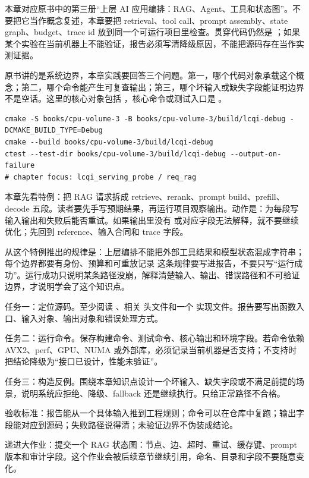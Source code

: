 
本章对应原书中的第三册“上层 AI 应用编排：RAG、Agent、工具和状态图”。不要把它当作概念复述，本章要把 retrieval、tool call、prompt assembly、state graph、budget、trace id 放到同一个可运行项目里检查。贯穿代码仍然是 ；如果某个实验在当前机器上不能验证，报告必须写清降级原因，不能把源码存在当作实测证据。


原书讲的是系统边界，本章实践要回答三个问题。第一，哪个代码对象承载这个概念；第二，哪个命令能产生可复查输出；第三，哪个坏输入或缺失字段能证明边界不是空话。这里的核心对象包括 ，核心命令或测试入口是 。

\begin{lstlisting}[numbers=none,caption={第 8 章实践：RAG、Agent 与状态图边界 的最小命令入口}]
cmake -S books/cpu-volume-3 -B books/cpu-volume-3/build/lcqi-debug -DCMAKE_BUILD_TYPE=Debug
cmake --build books/cpu-volume-3/build/lcqi-debug
ctest --test-dir books/cpu-volume-3/build/lcqi-debug --output-on-failure
# chapter focus: lcqi_serving_probe / req_rag
\end{lstlisting}


本章先看特例：把 RAG 请求拆成 retrieve、rerank、prompt build、prefill、decode 五段。读者要先手写预期结果，再运行项目观察输出。动作是：为每段写输入输出和失败后能否重试。如果输出里没有  或对应字段无法解释，就不要继续优化；先回到 reference、输入合同和 trace 字段。

从这个特例推出的规律是：上层编排不能把外部工具结果和模型状态混成字符串；每个边界都要有身份、预算和可重放记录 这条规律要写进报告，不要只写“运行成功”。运行成功只说明某条路径没崩，解释清楚输入、输出、错误路径和不可验证边界，才说明学会了这个知识点。


任务一：定位源码。至少阅读 、相关  头文件和一个  实现文件。报告要写出函数入口、输入对象、输出对象和错误处理方式。

任务二：运行命令。保存构建命令、测试命令、核心输出和环境字段。若命令依赖 AVX2、perf、GPU、NUMA 或外部库，必须记录当前机器是否支持；不支持时把结论降级为“接口已设计，性能未验证”。

任务三：构造反例。围绕本章知识点设计一个坏输入、缺失字段或不满足前提的场景，说明系统应拒绝、降级、fallback 还是继续执行。只给正常路径不合格。


验收标准：报告能从一个具体输入推到工程规则；命令可以在仓库中复跑；输出字段能对应到源码；失败路径说得清；未验证边界不伪装成结论。

递进大作业：提交一个 RAG 状态图：节点、边、超时、重试、缓存键、prompt 版本和审计字段。这个作业会被后续章节继续引用，命名、目录和字段不要随意变化。

